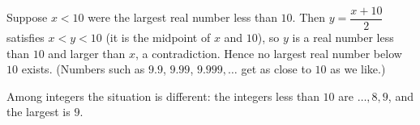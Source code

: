 Suppose $x<10$ were the largest real number less than $10$. Then $y=\dfrac{x+10}{2}$ satisfies $x<y<10$ (it is the midpoint of $x$ and $10$), so $y$ is a real number less than $10$ and larger than $x$, a contradiction. Hence no largest real number below $10$ exists. (Numbers such as $9.9$, $9.99$, $9.999,\dots$ get as close to $10$ as we like.)

Among integers the situation is different: the integers less than $10$ are $\dots,8,9$, and the largest is $\boxed{9}$.
